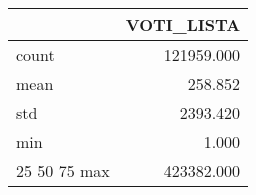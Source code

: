 \begin{tabular}{lr}
\toprule
 & VOTI_LISTA \\
\midrule
count & 121959.000 \\
mean & 258.852 \\
std & 2393.420 \\
min & 1.000 \\
25%
50%
75%
max & 423382.000 \\
\bottomrule
\end{tabular}
